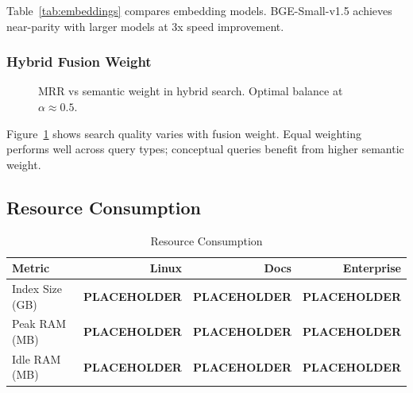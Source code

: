 \documentclass[conference]{IEEEtran}
\begin{document}
Table~\ref{tab:embeddings} compares embedding models. BGE-Small-v1.5 achieves near-parity with larger models at 3x speed improvement.

\subsubsection{Hybrid Fusion Weight}

\begin{figure}[htbp]
\centering
{}
\caption{MRR vs semantic weight in hybrid search. Optimal balance at $\alpha \approx 0.5$.}
\label{fig:fusion}
\end{figure}

Figure~\ref{fig:fusion} shows search quality varies with fusion weight. Equal weighting performs well across query types; conceptual queries benefit from higher semantic weight.

\subsection{Resource Consumption}

\begin{table}[htbp]
\caption{Resource Consumption}
\begin{center}
\begin{tabular}{lrrr}
\toprule
\textbf{Metric} & \textbf{Linux} & \textbf{Docs} & \textbf{Enterprise} \\
\midrule
Index Size (GB) & \textbf{PLACEHOLDER} & \textbf{PLACEHOLDER} & \textbf{PLACEHOLDER} \\
Peak RAM (MB) & \textbf{PLACEHOLDER} & \textbf{PLACEHOLDER} & \textbf{PLACEHOLDER} \\
Idle RAM (MB) & \textbf{PLACEHOLDER} & \textbf{PLACEHOLDER} & \textbf{PLACEHOLDER} \\
\bottomrule
\end{tabular}
\label{tab:resources}
\end{center}
\end{table}
\end{document}
